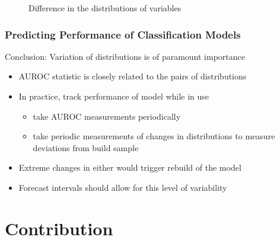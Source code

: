 \documentclass{beamer}
\begin{document}
\begin{frame}
\begin{figure}
\begin{minipage}[b]{0.45\linewidth}
            \caption{Difference in the distributions of variables}
        \end{minipage}
\end{figure}

\end{frame}



\begin{frame}
\frametitle{Predicting Performance of Classification Models}

Conclusion: Variation of distributions is of paramount importance
\begin{itemize}
    \item AUROC statistic is closely related to the pairs of distributions
     \item In practice, track performance of model while in use
     \begin{itemize}
         \item take AUROC measurements periodically
        \item take periodic measurements of changes in distributions to measure deviations from build sample
    \end{itemize}
    \item Extreme changes in either would trigger rebuild of the model
    \item Forecast intervals should allow for this level of variability
\end{itemize}

\end{frame}




\section{Contribution}


\end{document}
